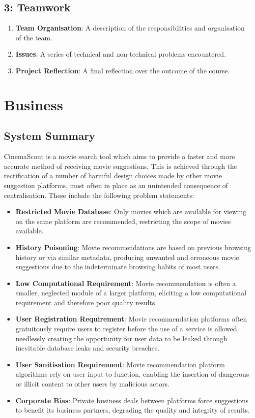 \documentclass{article}
\begin{document}
\subsection*{3: Teamwork}
\begin{enumerate}
\item \textbf{Team Organisation}: A description of the responsibilities and
organisation of the team.
\item \textbf{Issues}: A series of technical and non-technical problems
encountered.
\item \textbf{Project Reflection}: A final reflection over the outcome of the
course.
\end{enumerate}

\section{Business}
\subsection{System Summary}
CinemaScout is a movie search tool which aims to provide a faster and more
accurate method of receiving movie suggestions. This is achieved 
through the rectification of a number of harmful design choices made by other 
movie suggestion platforms, most often in place as an unintended consequence 
of centralisation. These include the following problem statements:
\begin{itemize}
\item \textbf{Restricted Movie Database}: Only movies which are available for
viewing on the same platform are recommended, restricting the scope of movies
available.
\item \textbf{History Poisoning}: Movie recommendations are based on previous
browsing history or via similar metadata, producing unwanted and erroneous
movie suggestions due to the indeterminate browsing habits of most users.
\item \textbf{Low Computational Requirement}: Movie recommendation is often a
smaller, neglected module of a larger platform, eliciting a low computational 
requirement and therefore poor quality results.
\item \textbf{User Registration Requirement}: Movie recommendation platforms
often gratuitously require users to register before the use of a service is
allowed, needlessly creating the opportunity for user data to be leaked through
inevitable database leaks and security breaches.
\item \textbf{User Sanitisation Requirement}: Movie recommendation platform
algorithms rely on user input to function, enabling the insertion of dangerous
or illicit content to other users by malicious actors.
\item \textbf{Corporate Bias}: Private business deals between platforms force
suggestions to benefit its business partners, degrading the quality and
integrity of results.
\end{itemize}
\end{document}
